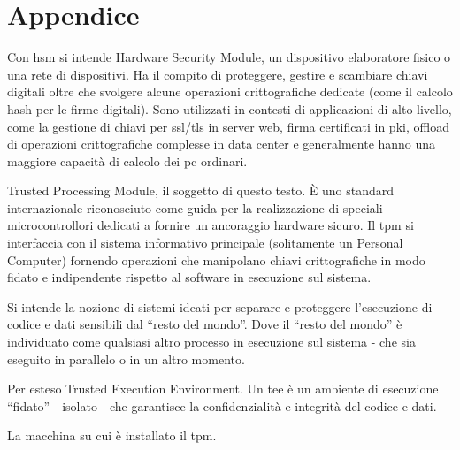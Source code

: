 \chapter*{Appendice}\label{ch:appendix}

\begin{description}[itemsep=2.5ex, parsep=0.5ex, leftmargin=2.5cm, style=nextline]

    \item[\textbf{\acrshort{hsm}}] Con \acrshort{hsm} si intende Hardware Security Module, un dispositivo elaboratore fisico o una rete di dispositivi. Ha il compito di proteggere, gestire e scambiare chiavi digitali oltre che svolgere alcune operazioni crittografiche dedicate (come il calcolo hash per le firme digitali). Sono utilizzati in contesti di applicazioni di alto livello, come la gestione di chiavi per \acrshort{ssl}/\acrshort{tls} in server web, firma certificati in \acrshort{pki}, offload di operazioni crittografiche complesse in data center e generalmente hanno una maggiore capacità di calcolo dei \acrshort{pc} ordinari.

    \item[\textbf{\acrshort{tpm}}] Trusted Processing Module, il soggetto di questo testo. È uno standard internazionale riconosciuto come guida per la realizzazione di speciali microcontrollori dedicati a fornire un ancoraggio hardware sicuro. Il \acrshort{tpm} si interfaccia con il sistema informativo principale (solitamente un Personal Computer) fornendo operazioni che manipolano chiavi crittografiche in modo fidato e indipendente rispetto al software in esecuzione sul sistema.

    \item[\textbf{Secure Enclave}] Si intende la nozione di sistemi ideati per separare e proteggere l’esecuzione di codice e dati sensibili dal “resto del mondo”. Dove il “resto del mondo” è individuato come qualsiasi altro processo in esecuzione sul sistema - che sia eseguito in parallelo o in un altro momento.

    \item[\textbf{\acrshort{tee}}] Per esteso Trusted Execution Environment. Un \acrshort{tee} è un ambiente di esecuzione “fidato” - isolato - che garantisce la confidenzialità e integrità del codice e dati. 

    \item[\textbf{Piattaforma}] La macchina su cui è installato il \acrshort{tpm}.


\end{description}
